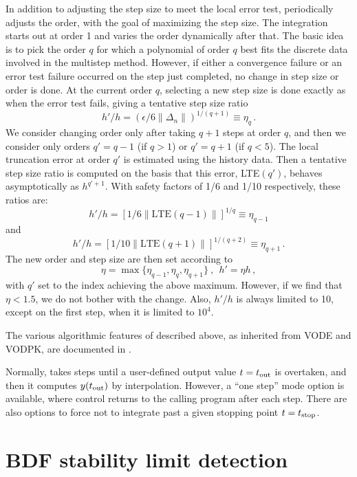 In addition to adjusting the step size to meet the local error test,
{\cvode} periodically adjusts the order, with the goal of maximizing the
step size.  The integration starts out at order 1 and varies the order
dynamically after that.  The basic idea is to pick the order $q$ for
which a polynomial of order $q$ best fits the discrete data involved
in the multistep method.  However, if either a convergence failure or
an error test failure occurred on the step just completed, no change
in step size or order is done.  At the current order $q$, selecting a
new step size is done exactly as when the error test fails, giving a
tentative step size ratio
\[ h'/h = (\epsilon / 6 \|\Delta_n\| )^{1/(q+1)} \equiv \eta_q \, . \]
We consider changing order only after taking $q+1$ steps at order $q$,
and then we consider only orders $q' = q - 1$ (if $q > 1$) or
$q' = q + 1$ (if $q < 5$).  The local truncation error at order $q'$
is estimated using the history data.  Then a tentative step size ratio
is computed on the basis that this error, LTE$(q')$, behaves
asymptotically as $h^{q'+1}$.  With safety factors of 1/6 and
1/10 respectively, these ratios are:
\[ h'/h = [1 / 6 \|\mbox{LTE}(q-1)\| ]^{1/q} \equiv \eta_{q-1} \]
and
\[ h'/h = [1 / 10 \|\mbox{LTE}(q+1)\| ]^{1/(q+2)} \equiv \eta_{q+1} \, . \]
The new order and step size are then set according to
\[ \eta = \max\{\eta_{q-1},\eta_q,\eta_{q+1}\} ~,~~ h' = \eta h \, , \]
with $q'$ set to the index achieving the above maximum.
However, if we find that $\eta < 1.5$, we do not bother with the
change.  Also, $h'/h$ is always limited to 10, except on the first
step, when it is limited to $10^4$.

The various algorithmic features of {\cvode} described above, as
inherited from VODE and VODPK, are documented in 
\cite{BBH:89,Byr:92,Hin:00}.

Normally, {\cvode} takes steps until a user-defined output value 
$t = t_{\mbox{\scriptsize out}}$ is overtaken, and then it computes
$y(t_{\mbox{\scriptsize out}})$ by interpolation.  However, a
``one step'' mode option is available, where control returns to the
calling program after each step.  There are also options to force
{\cvode} not to integrate past a given stopping point 
$t = t_{\mbox{\scriptsize stop}}$.


\section{BDF stability limit detection}\label{s:bdf_stab}

